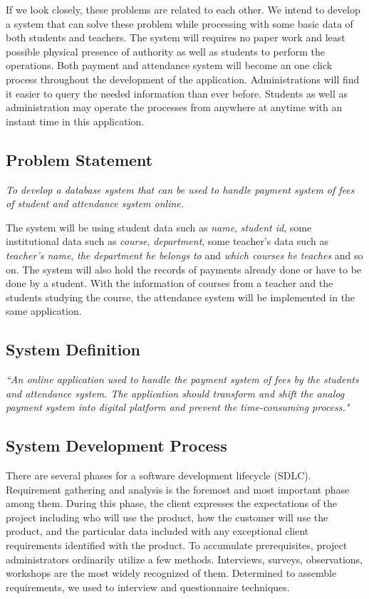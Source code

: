 If we look closely, these problems are related to each other. We intend to develop a system that can solve these problem while processing with some basic data of both students and teachers. The system will requires no paper work and least possible physical presence of authority as well as students to perform the operations. Both payment and attendance system will become an one click process throughout the development of the application. Administrations will find it easier to query the needed information than ever before. Students as well as administration may operate the processes from anywhere at anytime with an instant time in this application.

\subsection{Problem Statement}\label{subsec:ps} 

\emph{To develop a database system that can be used to handle payment system of fees of student and attendance system online.}

The system will be using student data such as \emph{name}, \emph{student id}, some institutional data such as \emph{course}, \emph{department}, some teacher's data such as \emph{teacher's name}, \emph{the department he belongs to} and \emph{which courses he teaches} and so on. The system will also hold the records of payments already done or have to be done by a student. With the information of courses from a teacher and the students studying the course, the attendance system will be implemented in the same application.

\clearpage

\subsection{System Definition}\label{subsec:sd} 

\textit{``An online application used to handle the payment system of fees by the students and attendance system. The application should transform and shift the analog payment system into digital platform and prevent the time-consuming process."}


\subsection{System Development Process}\label{subsec:sdp}

There are several phases for a software development lifecycle (SDLC). Requirement gathering and analysis is the foremost and most important phase among them. During this phase, the client expresses the expectations of the project including who will use the product, how the customer will use the product, and the particular data included with any exceptional client requirements identified with the product. To accumulate prerequisites, project administrators ordinarily utilize a few methods. Interviews, surveys, observations, workshops are the most widely recognized of them. Determined to assemble requirements, we used to interview and questionnaire techniques.\\

